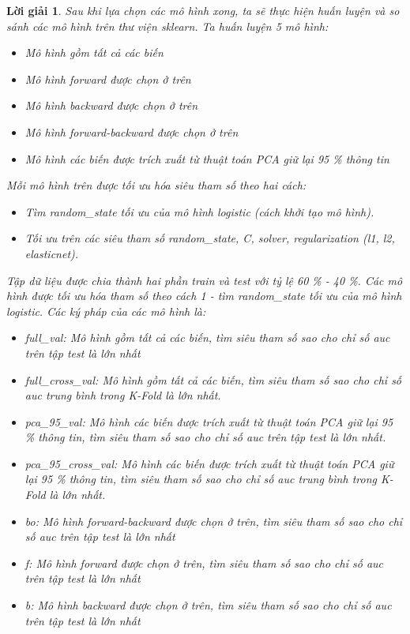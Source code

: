 \documentclass[14pt, a4paper]{article}
\theoremstyle{sltheorem}
\theoremstyle{soltheorem}
\newtheorem*{loigiai}{Lời giải}
\begin{document}
\begin{loigiai}
    Sau khi lựa chọn các mô hình xong, ta sẽ thực hiện huấn luyện và so sánh các mô hình trên thư viện sklearn.
    Ta huấn luyện 5 mô hình:

    \begin{itemize}
        \item Mô hình gồm tất cả các biến
        \item Mô hình forward được chọn ở trên
        \item Mô hình backward được chọn ở trên
        \item Mô hình forward-backward được chọn ở trên
        \item Mô hình các biến được trích xuất từ thuật toán PCA giữ lại 95 \% thông tin
    \end{itemize}

    Mỗi mô hình trên được tối ưu hóa siêu tham số theo hai cách:

    \begin{itemize}
        \item Tìm random\_state tối ưu của mô hình logistic (cách khởi tạo mô hình).
        \item Tối ưu trên các siêu tham số random\_state, C, solver, regularization (l1, l2, elasticnet).
    \end{itemize}

    Tập dữ liệu được chia thành hai phần train và test với tỷ lệ 60 \% - 40 \%.
    Các mô hình được tối ưu hóa tham số theo cách 1 - tìm random\_state tối ưu của mô hình logistic.
    Các ký pháp của các mô hình là:

    \begin{itemize}
        \item full\_val: Mô hình gồm tất cả các biến, tìm siêu tham số sao cho chỉ số auc trên tập test là lớn nhất
        \item full\_cross\_val: Mô hình gồm tất cả các biến, tìm siêu tham số sao cho chỉ số auc trung bình trong K-Fold là lớn nhất.
        \item pca\_95\_val: Mô hình các biến được trích xuất từ thuật toán PCA giữ lại 95 \% thông tin, tìm siêu tham số sao cho chỉ số auc trên tập test là lớn nhất.
        \item pca\_95\_cross\_val: Mô hình các biến được trích xuất từ thuật toán PCA giữ lại 95 \% thông tin, tìm siêu tham số sao cho chỉ số auc trung bình trong K-Fold là lớn nhất.
        \item bo: Mô hình forward-backward được chọn ở trên, tìm siêu tham số sao cho chỉ số auc trên tập test là lớn nhất
        \item f: Mô hình forward được chọn ở trên, tìm siêu tham số sao cho chỉ số auc trên tập test là lớn nhất
        \item b: Mô hình backward được chọn ở trên, tìm siêu tham số sao cho chỉ số auc trên tập test là lớn nhất
    \end{itemize}


\end{loigiai}
\end{document}
